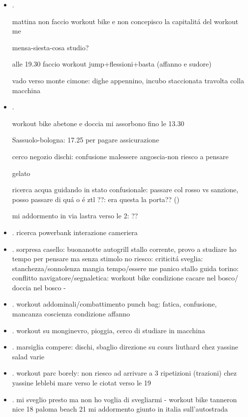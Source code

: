 \begin{itemize}
\item {}.

mattina non faccio workout bike e non concepisco la capitalit\'a del workout me

mensa-siesta-cosa studio?

alle 19.30 faccio workout jump+flessioni+basta (affanno e sudore)

vado verso monte cimone: dighe appennino, incubo staccionata travolta colla macchina

\item {}.

workout bike abetone e doccia mi assorbono fino le 13.30

Sassuolo-bologna: 17.25 per pagare assicurazione

cerco negozio dischi: confusione malessere angoscia-non riesco a pensare

gelato

ricerca acqua guidando in stato confusionale: passare col rosso vs sanzione, posso passare di qu\'a o \'e ztl ??: era questa la porta?? ()

mi addormento in via lastra verso le 2: ??

\item {}.
ricerca powerbank
interazione cameriera 
\item {}.
sorpresa casello: buonanotte
autogrill stallo corrente, provo a studiare
ho tempo per pensare ma senza stimolo no riesco: 
criticit\'a sveglia: stanchezza/sonnolenza mangia tempo/essere me
panico stallo guida torino: conflitto navigatore/segnaletica: 
workout bike
condizione cacare nel bosco/ doccia nel bosco - 

\item {}.
workout addominali/combattimento punch bag: fatica, confusione, mancanza coscienza condizione affanno

\item {}.
workout su monginevro, pioggia, cerco di studiare in macchina

\item {}.
marsiglia compere: dischi, sbaglio direzione su cours liuthard
chez yassine salad varie
\item {}.
workout parc borely: non riesco ad arrivare a 3 ripetizioni (trazioni)
chez yassine leblebi
mare verso le ciotat verso le 19
\item {}.
mi sveglio presto ma non ho voglia di svegliarmi - workout bike tanneron
nice 18
paloma beach 21
mi addormento giunto in italia sull'autostrada


\end{itemize}
